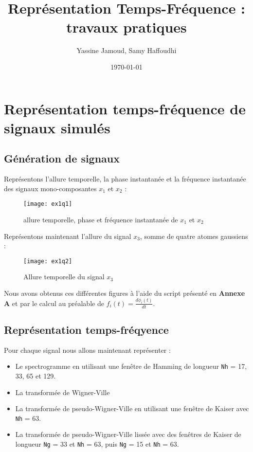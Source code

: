 \documentclass[12pt,a4paper,titlepage]{article}
\title{Représentation  Temps-Fréquence : travaux pratiques}
\author{Yassine Jamoud, Samy Haffoudhi}
\date{\today}
\begin{document}
\maketitle

\setcounter{section}{1}

\section{Représentation temps-fréquence de signaux simulés}

\subsection{Génération de signaux}

Représentons l'allure temporelle, la phase instantanée et la fréquence instantanée des signaux
mono-composantes $x_1$ et $x_2$ :

\begin{figure}[H]
    \caption{allure temporelle, phase et fréquence instantanée de $x_1$ et $x_2$}
    \texttt{[image: ex1q1]}
    \centering
\end{figure}

Représentons maintenant l'allure du signal $x_3$, somme de quatre atomes gaussiens :

\begin{figure}[H]
    \caption{Allure temporelle du signal $x_3$}
    \texttt{[image: ex1q2]}
    \centering
\end{figure}

Nous avons obtenus ces différentes figures à l'aide du script présenté en \textbf{Annexe A} et par le calcul
au préalable de $f_i(t) = \frac{d\phi_i(t)}{dt}$.

\subsection{Représentation temps-fréqyence}

Pour chaque signal nous allons maintenant représenter :

\begin{itemize}
    \item{Le spectrogramme en utilisant une fenêtre de Hamming de longueur \texttt{Nh} = 17, 33, 65
        et 129.}
    \item{La transformée de Wigner-Ville}
    \item{La transformée de pseudo-Wigner-Ville en utilisant une fenêtre de Kaiser avec \texttt{Nh}
        = 63.}
    \item{La transformée de pseudo-Wigner-Ville lissée avec des fenêtres de Kaiser de longueur
        \texttt{Ng} = 33 et \texttt{Nh} = 63, puis \texttt{Ng} = 15 et \texttt{Nh} = 63.}
\end{itemize}
\end{document}
